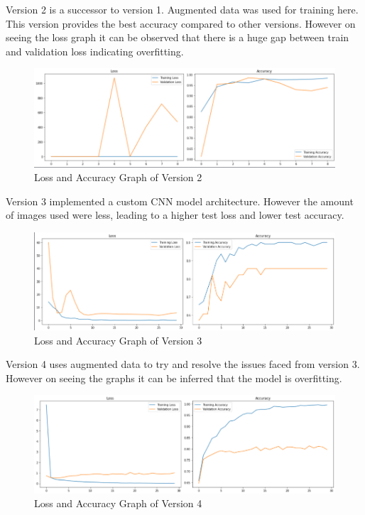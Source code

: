 Version 2 is a successor to version 1. Augmented data was used for training here. This version provides the best accuracy compared to other versions. However on seeing the loss graph it can be observed that there is a huge gap between train and validation loss indicating overfitting.
\begin{figure}[H]
\includegraphics[scale=0.6]{Photos/v2.PNG}
\caption{Loss and Accuracy Graph of Version 2} \label{fig:v2}
\end{figure}

Version 3 implemented a custom CNN model architecture. However the amount of images used were less, leading to a higher test loss and lower test accuracy.
\begin{figure}[H]
\includegraphics[scale=0.6]{Photos/v3.PNG}
\caption{Loss and Accuracy Graph of Version 3} \label{fig:v3}
\end{figure}

Version 4 uses augmented data to try and resolve the issues faced from version 3. However on seeing the graphs it can be inferred that the model is overfitting.
\begin{figure}[H]
\includegraphics[scale=0.6]{Photos/v4.PNG}
\caption{Loss and Accuracy Graph of Version 4} \label{fig:v4}
\end{figure}

